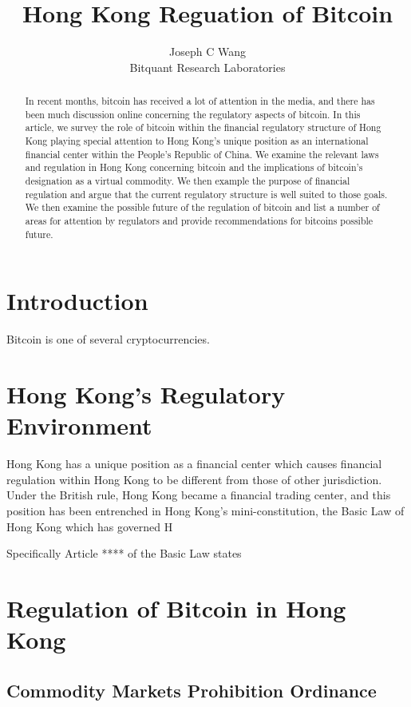 \title{Hong Kong Reguation of Bitcoin}
\author{Joseph C Wang\\
\small Bitquant Research Laboratories
}

\begin{abstract}
In recent months, bitcoin has received a lot of attention in the
media, and there has been much discussion online concerning the
regulatory aspects of bitcoin.  In this article, we survey the role of
bitcoin within the financial regulatory structure of Hong Kong playing
special attention to Hong Kong's unique position as an international
financial center within the People's Republic of China.  We examine
the relevant laws and regulation in Hong Kong concerning bitcoin and
the implications of bitcoin's designation as a virtual commodity.  We
then example the purpose of financial regulation and argue that the
current regulatory structure is well suited to those goals.  We then
examine the possible future of the regulation of bitcoin and list a
number of areas for attention by regulators and provide
recommendations for bitcoins possible future.
\end{abstract}

\section{Introduction}

Bitcoin is one of several cryptocurrencies.

\section{Hong Kong's Regulatory Environment}
Hong Kong has a unique position as a financial center which causes
financial regulation within Hong Kong to be different from those of
other jurisdiction.  Under the British rule, Hong Kong became a
financial trading center, and this position has been entrenched in
Hong Kong's mini-constitution, the Basic Law of Hong Kong which has
governed H

Specifically Article **** of the Basic Law states

\section{Regulation of Bitcoin in Hong Kong}



\subsection{Commodity Markets Prohibition Ordinance}



